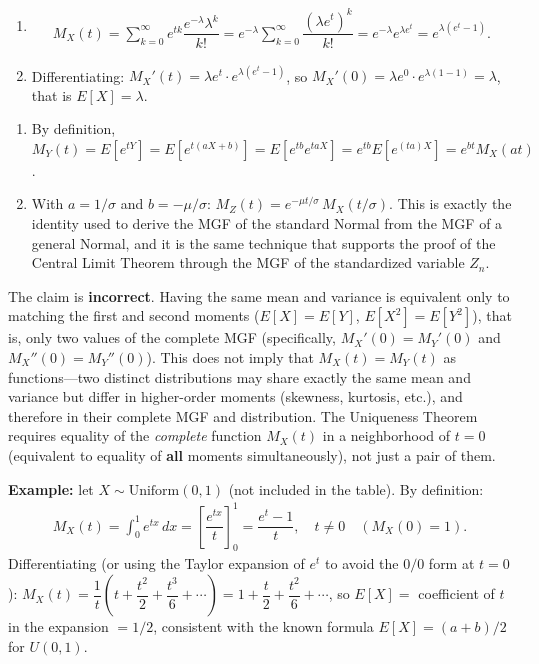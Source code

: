 \begin{solproblema}[prob:2c4cd93]
	\begin{enumerate}
		\item
		\begin{align*}
			M_X(t) = \sum_{k=0}^{\infty} e^{tk}\dfrac{e^{-\lambda}\lambda^k}{k!} = e^{-\lambda}\sum_{k=0}^{\infty}\dfrac{(\lambda e^t)^k}{k!} = e^{-\lambda}e^{\lambda e^t} = e^{\lambda(e^t-1)}.
		\end{align*}
		\item Differentiating: $M_X'(t) = \lambda e^t \cdot e^{\lambda(e^t-1)}$, so $M_X'(0) = \lambda e^0 \cdot e^{\lambda(1-1)} = \lambda$, that is $E[X]=\lambda$.
	\end{enumerate}
\end{solproblema}

\begin{solproblema}[prob:cf5e60c]
	\begin{enumerate}
		\item By definition, $M_Y(t) = E[e^{tY}] = E[e^{t(aX+b)}] = E[e^{tb}e^{taX}] = e^{tb}E[e^{(ta)X}] = e^{bt}M_X(at)$.
		\item With $a=1/\sigma$ and $b=-\mu/\sigma$: $M_Z(t) = e^{-\mu t/\sigma}\,M_X(t/\sigma)$. This is exactly the identity used to derive the MGF of the standard Normal from the MGF of a general Normal, and it is the same technique that supports the proof of the Central Limit Theorem through the MGF of the standardized variable $Z_n$.
	\end{enumerate}
\end{solproblema}

\begin{solproblema}[prob:5098ae4]
	The claim is \textbf{incorrect}. Having the same mean and variance is equivalent only to matching the first and second moments ($E[X]=E[Y]$, $E[X^2]=E[Y^2]$), that is, only two values of the complete MGF (specifically, $M_X'(0)=M_Y'(0)$ and $M_X''(0)=M_Y''(0)$). This does not imply that $M_X(t)=M_Y(t)$ as functions---two distinct distributions may share exactly the same mean and variance but differ in higher-order moments (skewness, kurtosis, etc.), and therefore in their complete MGF and distribution. The Uniqueness Theorem requires equality of the \emph{complete} function $M_X(t)$ in a neighborhood of $t=0$ (equivalent to equality of \textbf{all} moments simultaneously), not just a pair of them.
\end{solproblema}

\begin{solproblema}[prob:a48cc99]
	\textbf{Example:} let $X \sim \text{Uniform}(0,1)$ (not included in the table). By definition:
	\begin{align*}
		M_X(t) = \int_0^1 e^{tx}\,dx = \left[\dfrac{e^{tx}}{t}\right]_0^1 = \dfrac{e^t-1}{t}, \quad t\neq0 \quad (M_X(0)=1).
	\end{align*}
	Differentiating (or using the Taylor expansion of $e^t$ to avoid the $0/0$ form at $t=0$): $M_X(t) = \dfrac{1}{t}\left(t+\dfrac{t^2}{2}+\dfrac{t^3}{6}+\cdots\right) = 1+\dfrac{t}{2}+\dfrac{t^2}{6}+\cdots$, so $E[X] = $ coefficient of $t$ in the expansion $= 1/2$, consistent with the known formula $E[X]=(a+b)/2$ for $U(0,1)$.
\end{solproblema}
